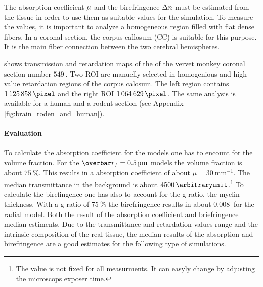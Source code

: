 %
The absorption coefficient $\textnormal{$\mu$}{}$ and the birefringence $\textnormal{$\Delta n$}{}$ must be estimated from the tissue in order to use them as suitable values for the simulation.
To measure the values, it is important to analyze a homogeneous region filled with flat dense fibers.
In a coronal section, the corpus callosum (CC) is suitable for this purpose. 
It is the main fiber connection between the two cerebral hemispheres.
\par
% 
 shows transmission and retardation maps of the of the vervet monkey coronal section number $\SI{549}{}$.
Two \ac{ROI} are manuelly selected in homogenious and high value retardation regions of the corpus calosum.
The left region contains $\SI{1125858}{\pixel}$ and the right \ac{ROI} $\SI{1064629}{\pixel}$.
The same analysis is available for a human and a rodent section (see Appendix \cref{fig:brain_roden_and_human}).
% 
\paragraph{Evaluation}
To calculate the absorption coefficient for the models one has to encount for the volume fraction.
For the $\fiberRadiusMean = \SI{0.5}{\micro\meter}$ models the volume fraction is about $\SI{75}{\percent}$.
This results in a absorption coefficient of about $\mu = \SI{30}{\milli\meter\tothe{-1}}$.
The median transmittance in the background is about $\SI{4500}{\arbitraryunit}$.\footnote{The value is not fixed for all measurments. It can easyly change by adjusting \eg{} the microscops exposer time.}
To calculate the birefingence one has also to account for the g-ratio, \ie{} the myelin thickness.
With a g-ratio of $\SI{75}{\percent}$ the birefringence results in about $\SI{0.008}{}$ for the radial model.
Both the result of the absorption coefficient and briefringence median estiments.
Due to the transmittance and retardation values range and the intrinsic composition of the real tissue, the median results of the absorption and birefringence are a good estimates for the following type of simulations.
%
% 
% 
